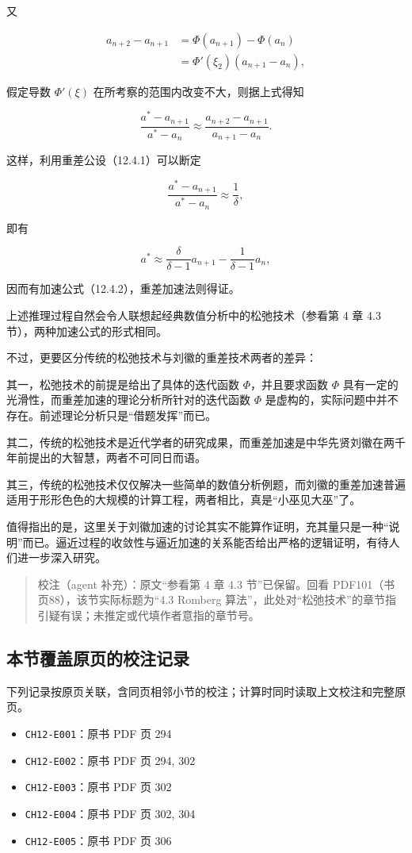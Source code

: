 \documentclass[
  10pt,
  fontset=fandol]{ctexart}
\providecommand{\tightlist}{%
  \setlength{\itemsep}{0pt}\setlength{\parskip}{0pt}}
\begin{document}
又

\[
\begin{aligned}
a_{n+2}-a_{n+1}&=\Phi(a_{n+1})-\Phi(a_n)\\
&=\Phi'(\xi_2)(a_{n+1}-a_n),
\end{aligned}
\]

假定导数 \(\Phi'(\xi)\) 在所考察的范围内改变不大，则据上式得知

\[
\frac{a^*-a_{n+1}}{a^*-a_n}\approx\frac{a_{n+2}-a_{n+1}}{a_{n+1}-a_n}.
\]

这样，利用重差公设（12.4.1）可以断定

\[
\frac{a^*-a_{n+1}}{a^*-a_n}\approx\frac1\delta,
\]

即有

\[
a^*\approx\frac{\delta}{\delta-1}a_{n+1}-\frac1{\delta-1}a_n,
\]

因而有加速公式（12.4.2），重差加速法则得证。

上述推理过程自然会令人联想起经典数值分析中的松弛技术（参看第 4 章 4.3 节），两种加速公式的形式相同。

不过，更要区分传统的松弛技术与刘徽的重差技术两者的差异：

其一，松弛技术的前提是给出了具体的迭代函数 \(\Phi\)，并且要求函数 \(\Phi\) 具有一定的光滑性，而重差加速的理论分析所针对的迭代函数 \(\Phi\) 是虚构的，实际问题中并不存在。前述理论分析只是``借题发挥''而已。

其二，传统的松弛技术是近代学者的研究成果，而重差加速是中华先贤刘徽在两千年前提出的大智慧，两者不可同日而语。

其三，传统的松弛技术仅仅解决一些简单的数值分析例题，而刘徽的重差加速普遍适用于形形色色的大规模的计算工程，两者相比，真是``小巫见大巫''了。

值得指出的是，这里关于刘徽加速的讨论其实不能算作证明，充其量只是一种``说明''而已。逼近过程的收敛性与逼近加速的关系能否给出严格的逻辑证明，有待人们进一步深入研究。

\begin{quote}
校注（agent 补充）：原文``参看第 4 章 4.3 节''已保留。回看 PDF101（书页88），该节实际标题为``4.3 Romberg 算法''，此处对``松弛技术''的章节指引疑有误；未推定或代填作者意指的章节号。
\end{quote}

\subsection{本节覆盖原页的校注记录}\label{ux672cux8282ux8986ux76d6ux539fux9875ux7684ux6821ux6ce8ux8bb0ux5f55}

下列记录按原页关联，含同页相邻小节的校注；计算时同时读取上文校注和完整原页。

\begin{itemize}
\tightlist
\item
  \texttt{CH12-E001}：原书 PDF 页 294
\item
  \texttt{CH12-E002}：原书 PDF 页 294, 302
\item
  \texttt{CH12-E003}：原书 PDF 页 302
\item
  \texttt{CH12-E004}：原书 PDF 页 302, 304
\item
  \texttt{CH12-E005}：原书 PDF 页 306
\end{itemize}
\end{document}
